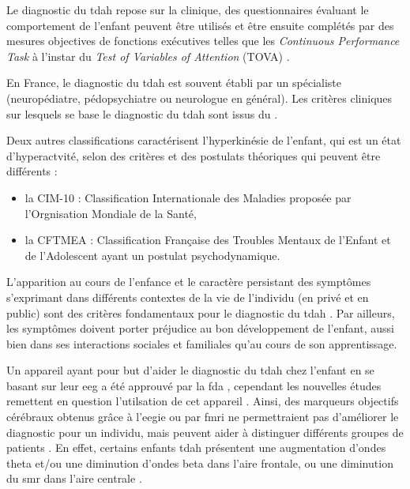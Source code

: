 Le diagnostic du \gls{tdah} repose sur la clinique, des questionnaires évaluant le comportement de l'enfant peuvent être utilisés et être ensuite 
complétés par des mesures objectives de fonctions exécutives telles que les \textit{Continuous Performance Task} \citep{Barkley1991} à l'instar du 
\textit{Test of Variables of Attention} (TOVA) \citep{Forbes1998}.

En France, le diagnostic du \gls{tdah} est souvent établi par un spécialiste (neuropédiatre, pédopsychiatre ou neurologue en général).
Les critères cliniques sur lesquels se base le diagnostic du \gls{tdah} sont issus du \citet{DSM-5}.

Deux autres classifications caractérisent l'hyperkinésie de l'enfant, qui est un état d'hyperactvité, selon des critères et des postulats théoriques 
qui peuvent être différents : 
\begin{itemize}
\item la CIM-10 : Classification Internationale des Maladies proposée par l'Orgnisation Mondiale de la Santé,
\item la CFTMEA : Classification Française des Troubles Mentaux de l'Enfant et de l'Adolescent ayant un postulat psychodynamique.
\end{itemize}

L'apparition au cours de l'enfance et le caractère persistant des symptômes s'exprimant dans différents contextes de la vie de l'individu (en privé et 
en public) sont des critères fondamentaux pour le diagnostic du \gls{tdah} \citep{HAS}. Par ailleurs, les symptômes doivent porter préjudice au bon 
développement de l'enfant, aussi bien dans ses interactions sociales et familiales qu'au cours de son apprentissage. 

Un appareil ayant pour but d'aider le diagnostic du \gls{tdah} chez l'enfant en se basant sur leur \gls{eeg} 
a été approuvé par la \gls{fda} \citep{FDA, NebaHealth}, cependant les nouvelles études remettent en question l'utilsation de cet appareil \citep{Arns2013, 
Zhang2017}. Ainsi, des marqueurs objectifs cérébraux obtenus grâce à l'\gls{eegie} ou par \gls{fmri} ne permettraient pas d'améliorer le diagnostic pour un individu, mais
peuvent aider à distinguer différents groupes de patients \citep{Johnstone2005, Zhang2017, Clarke2011}. En effet, certains enfants \gls{tdah} 
présentent une augmentation d'ondes theta et/ou une diminution d'ondes beta dans l'aire frontale, ou une diminution du \gls{smr} dans l'aire centrale
\citep{Monastra2005, Janzen1995, Loo2018}. 

